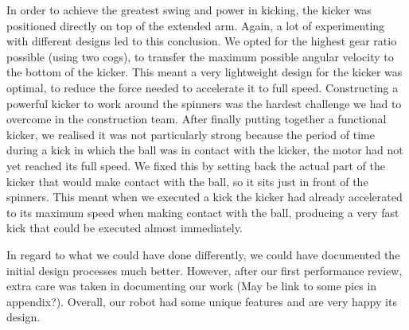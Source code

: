 In order to achieve the greatest swing and power in kicking, the kicker was positioned directly on top of the extended arm. Again, a lot of experimenting with different designs led to this conclusion. We opted for the highest gear ratio possible (using two cogs), to transfer the maximum possible angular velocity to the bottom of the kicker. This meant a very lightweight design for the kicker was optimal, to reduce the force needed to accelerate it to full speed. Constructing a powerful kicker to work around the spinners was the hardest challenge we had to overcome in the construction team. After finally putting together a functional kicker, we realised it was not particularly strong because the period of time during a kick in which the ball was in contact with the kicker, the motor had not yet reached its full speed. We fixed this by setting back the actual part of the kicker that would make contact with the ball, so it sits just in front of the spinners. This meant when we executed a kick the kicker had already accelerated to its maximum speed when making contact with the ball, producing a very fast kick that could be executed almost immediately.


In regard to what we could have done differently, we could have documented the initial design processes much better. However, after our first performance review, extra care was taken in documenting our work (May be link to some pics in appendix?). Overall, our robot had some unique features and are very happy its design.
